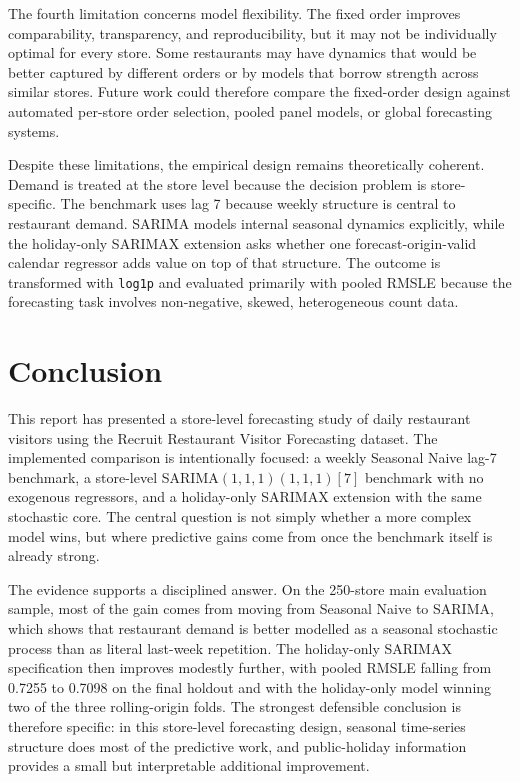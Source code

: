 \documentclass[11pt,oneside]{scrartcl}
\begin{document}
The fourth limitation concerns model flexibility. The fixed order improves comparability, transparency, and reproducibility, but it may not be individually optimal for every store. Some restaurants may have dynamics that would be better captured by different orders or by models that borrow strength across similar stores. Future work could therefore compare the fixed-order design against automated per-store order selection, pooled panel models, or global forecasting systems.

Despite these limitations, the empirical design remains theoretically coherent. Demand is treated at the store level because the decision problem is store-specific. The benchmark uses lag 7 because weekly structure is central to restaurant demand. SARIMA models internal seasonal dynamics explicitly, while the holiday-only SARIMAX extension asks whether one forecast-origin-valid calendar regressor adds value on top of that structure. The outcome is transformed with \texttt{log1p} and evaluated primarily with pooled RMSLE because the forecasting task involves non-negative, skewed, heterogeneous count data.

\section{Conclusion}
This report has presented a store-level forecasting study of daily restaurant visitors using the Recruit Restaurant Visitor Forecasting dataset. The implemented comparison is intentionally focused: a weekly Seasonal Naive lag-7 benchmark, a store-level SARIMA$(1,1,1)(1,1,1)[7]$ benchmark with no exogenous regressors, and a holiday-only SARIMAX extension with the same stochastic core. The central question is not simply whether a more complex model wins, but where predictive gains come from once the benchmark itself is already strong.

The evidence supports a disciplined answer. On the 250-store main evaluation sample, most of the gain comes from moving from Seasonal Naive to SARIMA, which shows that restaurant demand is better modelled as a seasonal stochastic process than as literal last-week repetition. The holiday-only SARIMAX specification then improves modestly further, with pooled RMSLE falling from 0.7255 to 0.7098 on the final holdout and with the holiday-only model winning two of the three rolling-origin folds. The strongest defensible conclusion is therefore specific: in this store-level forecasting design, seasonal time-series structure does most of the predictive work, and public-holiday information provides a small but interpretable additional improvement.
\end{document}
